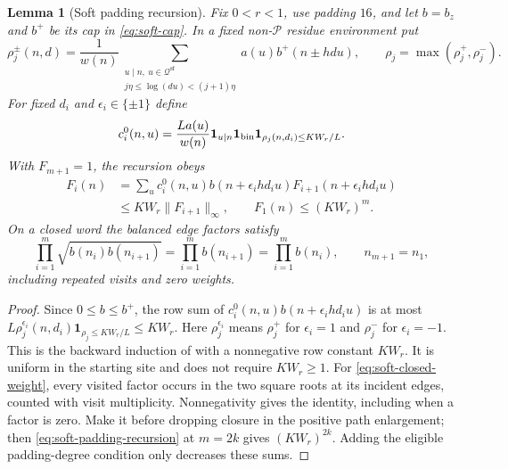 \documentclass[11pt]{article}
\newtheorem{lemma}[theorem]{Lemma}
\theoremstyle{definition}
\newcommand{\ind}{\mathbf 1}
\newcommand{\Pset}{\mathcal P}
\theoremstyle{remark}
\numberwithin{equation}{section}
\newcommand{\Qset}{\mathcal Q}
\newcommand{\sfw}{\mathrm{sf}}
\begin{document}
\begin{lemma}[Soft padding recursion]\label{lem:soft-recursion}
Fix $0<r<1$, use padding $16$, and let $b=b_z$ and $b^+$ be its cap in \eqref{eq:soft-cap}.
In a fixed non-$\Pset$ residue environment put
\begin{equation}\label{eq:soft-recursion-probabilities}
 \rho_j^\pm(n,d)=\frac1{w(n)}\sum_{\substack{u\mid n,\ u\in\Qset^{\sfw}\\j\eta\le\log(du)<(j+1)\eta}}
 a(u)b^+(n\pm hdu),\qquad \rho_j=\max(\rho_j^+,\rho_j^-).
\end{equation}
For fixed $d_i$ and $\epsilon_i\in\{\pm1\}$ define
\begin{equation}\label{eq:soft-recursion-coefficients}
 c_i^0(n,u)=\frac{La(u)}{w(n)}\ind_{u\mid n}\ind_{\rm bin}
 \ind_{\rho_j(n,d_i)\le KW_r/L}.
\end{equation}
With $F_{m+1}=1$, the recursion obeys
\begin{equation}\label{eq:soft-padding-recursion}
\begin{aligned}
 F_i(n)&=\sum_u c_i^0(n,u)b(n+\epsilon_i h d_i u)F_{i+1}(n+\epsilon_i h d_i u)\\
 &\le KW_r\|F_{i+1}\|_\infty,\qquad F_1(n)\le(KW_r)^m.
\end{aligned}
\end{equation}
On a closed word the balanced edge factors satisfy
\begin{equation}\label{eq:soft-closed-weight}
 \prod_{i=1}^m\sqrt{b(n_i)b(n_{i+1})}
 =\prod_{i=1}^m b(n_{i+1})=\prod_{i=1}^m b(n_i),\qquad n_{m+1}=n_1,
\end{equation}
including repeated visits and zero weights.
\end{lemma}
\begin{proof}
Since $0\le b\le b^+$, the row sum of $c_i^0(n,u)b(n+\epsilon_i h d_i u)$ is at most
$L\rho_j^{\epsilon_i}(n,d_i)\ind_{\rho_j\le KW_r/L}\le KW_r$.
Here $\rho_j^{\epsilon_i}$ means $\rho_j^+$ for $\epsilon_i=1$ and $\rho_j^-$ for $\epsilon_i=-1$.
This is the backward induction of \cite[Lemma~7.3, p.~37]{OpenAI007} with a nonnegative row constant $KW_r$.
It is uniform in the starting site and does not require $KW_r\ge1$.
For \eqref{eq:soft-closed-weight}, every visited factor occurs in the two square roots at its incident edges,
counted with visit multiplicity. Nonnegativity gives the identity, including when a factor is zero.
Make it before dropping closure in the positive path enlargement; then \eqref{eq:soft-padding-recursion} at $m=2k$
gives $(KW_r)^{2k}$. Adding the eligible padding-degree condition only decreases these sums.
\end{proof}
\end{document}
